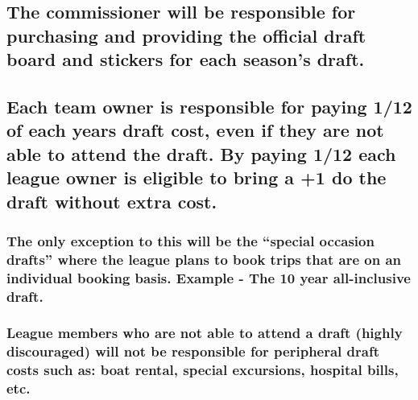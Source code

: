 \documentclass[
]{book}
\begin{document}
\hypertarget{the-commissioner-will-be-responsible-for-purchasing-and-providing-the-official-draft-board-and-stickers-for-each-seasons-draft.}{%
\subsection{The commissioner will be responsible for purchasing and providing the official draft board and stickers for each season's draft.}\label{the-commissioner-will-be-responsible-for-purchasing-and-providing-the-official-draft-board-and-stickers-for-each-seasons-draft.}}

\hypertarget{each-team-owner-is-responsible-for-paying-112-of-each-years-draft-cost-even-if-they-are-not-able-to-attend-the-draft.-by-paying-112-each-league-owner-is-eligible-to-bring-a-1-do-the-draft-without-extra-cost.}{%
\subsection{Each team owner is responsible for paying 1/12 of each years draft cost, even if they are not able to attend the draft. By paying 1/12 each league owner is eligible to bring a +1 do the draft without extra cost.}\label{each-team-owner-is-responsible-for-paying-112-of-each-years-draft-cost-even-if-they-are-not-able-to-attend-the-draft.-by-paying-112-each-league-owner-is-eligible-to-bring-a-1-do-the-draft-without-extra-cost.}}

\hypertarget{the-only-exception-to-this-will-be-the-special-occasion-drafts-where-the-league-plans-to-book-trips-that-are-on-an-individual-booking-basis.-example---the-10-year-all-inclusive-draft.}{%
\subsubsection{The only exception to this will be the ``special occasion drafts'' where the league plans to book trips that are on an individual booking basis. Example - The 10 year all-inclusive draft.}\label{the-only-exception-to-this-will-be-the-special-occasion-drafts-where-the-league-plans-to-book-trips-that-are-on-an-individual-booking-basis.-example---the-10-year-all-inclusive-draft.}}

\hypertarget{league-members-who-are-not-able-to-attend-a-draft-highly-discouraged-will-not-be-responsible-for-peripheral-draft-costs-such-as-boat-rental-special-excursions-hospital-bills-etc.}{%
\subsubsection{League members who are not able to attend a draft (highly discouraged) will not be responsible for peripheral draft costs such as: boat rental, special excursions, hospital bills, etc.}\label{league-members-who-are-not-able-to-attend-a-draft-highly-discouraged-will-not-be-responsible-for-peripheral-draft-costs-such-as-boat-rental-special-excursions-hospital-bills-etc.}}
\end{document}
